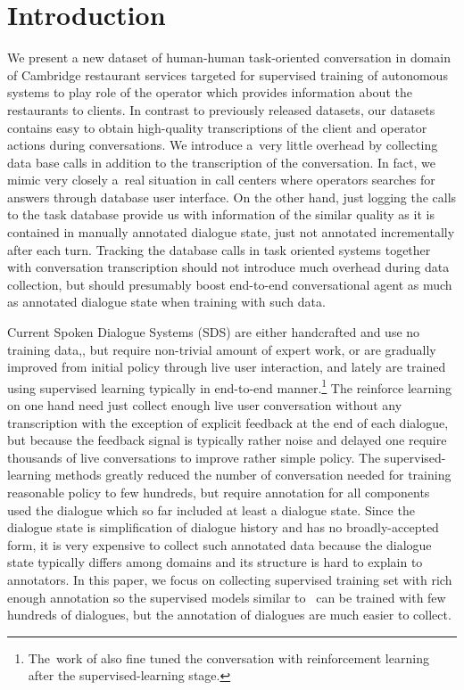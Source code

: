 \documentclass[runningheads,a4paper]{llncs}
\begin{document}

\section{Introduction}\label{sec:intro}
We present a new dataset of human-human task-oriented conversation in domain of Cambridge restaurant services targeted for supervised training of autonomous systems to play role of the operator which provides information about the restaurants to clients.
In contrast to previously released datasets, our datasets contains easy to obtain high-quality transcriptions of the client and operator actions during conversations.
We introduce a~very little overhead by collecting data base calls in addition to the transcription of the conversation. 
In fact, we mimic very closely a~real situation in call centers where operators searches for answers through database user interface. 
On the other hand, just logging the calls to the task database provide us with information of the similar quality as it is contained in manually annotated dialogue state, just not annotated incrementally after each turn.
Tracking the database calls in task oriented systems together with conversation transcription should not introduce much overhead during data collection, but should presumably boost end-to-end conversational agent as much as annotated dialogue state when training with such data.

Current Spoken Dialogue Systems (SDS) are either handcrafted and use no training data\cite{alex},\cite{todo}, but require non-trivial amount of expert work, or are gradually improved from initial policy through live user interaction\cite{Pomdp-young,gasix}, and lately are trained using supervised learning typically in end-to-end manner\cite{Wen2016,Williams2016}.\footnote{The~work of \cite{Williams2016} also fine tuned the conversation with reinforcement learning after the supervised-learning stage.}
The reinforce learning on one hand need just collect enough live user conversation without any transcription with the exception of explicit feedback at the end of each dialogue, but because the feedback signal is typically rather noise and delayed one require thousands of live conversations to improve rather simple policy.\cite{gasic}
The supervised-learning methods greatly reduced the number of conversation needed for training reasonable policy to few hundreds\cite{Wen2016}, but require annotation for all components used the dialogue which so far included at least a dialogue state\cite{Wen, his}.
Since the dialogue state is simplification of dialogue history and has no broadly-accepted form, it is very expensive to collect such annotated data because the dialogue state typically differs among domains and its structure is hard to explain to annotators.
In this paper, we focus on collecting supervised training set with rich enough annotation so the supervised models similar to~\cite{Wen2016} can be trained with few hundreds of dialogues, but the annotation of dialogues are much easier to collect.
\end{document}
